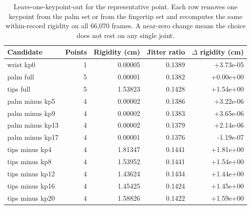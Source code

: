 \begin{table}[H]
\centering
\caption{Leave-one-keypoint-out for the representative point. Each row removes one keypoint from the palm set or from the fingertip set and recomputes the same within-record rigidity on all 66,070 frames. A near-zero change means the choice does not rest on any single joint.}
\label{tab:p1-loo}
\scriptsize
\begin{tabular}{lrrrr}
\toprule
Candidate & Points & Rigidity (cm) & Jitter ratio & $\Delta$ rigidity (cm) \\
\midrule
wrist kp0 & 1 & 0.00005 & 0.1389 & +3.73e-05 \\
palm full & 5 & 0.00001 & 0.1382 & +0.00e+00 \\
tips full & 5 & 1.53823 & 0.1428 & +1.54e+00 \\
palm minus kp5 & 4 & 0.00002 & 0.1386 & +3.22e-06 \\
palm minus kp9 & 4 & 0.00002 & 0.1383 & +3.65e-06 \\
palm minus kp13 & 4 & 0.00002 & 0.1379 & +2.14e-06 \\
palm minus kp17 & 4 & 0.00001 & 0.1376 & -1.19e-07 \\
tips minus kp4 & 4 & 1.81347 & 0.1441 & +1.81e+00 \\
tips minus kp8 & 4 & 1.53952 & 0.1441 & +1.54e+00 \\
tips minus kp12 & 4 & 1.43624 & 0.1434 & +1.44e+00 \\
tips minus kp16 & 4 & 1.45425 & 0.1424 & +1.45e+00 \\
tips minus kp20 & 4 & 1.58826 & 0.1422 & +1.59e+00 \\
\bottomrule
\end{tabular}
\end{table}
